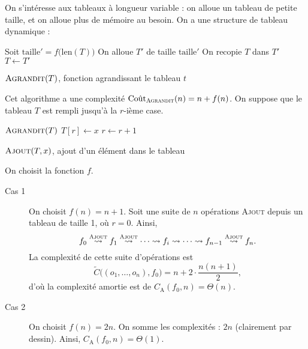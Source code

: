 \documentclass[a4paper]{article}
\begin{document}
	\begin{exm}
		On s'intéresse aux tableaux à longueur variable : on alloue un tableau de petite taille, et on alloue plus de mémoire au besoin.
		On a une structure de tableau dynamique :
		\begin{algorithm}[H]
			\centering
			\begin{algorithmic}[1]
				\State Soit $\mathrm{taille}' = f\big(\mathrm{len}(T)\big)$ 
				\State On alloue $T'$\/ de taille $\mathrm{taille}'$
				\State On recopie $T$\/ dans $T'$\/
				\State $T \gets T'$\/
			\end{algorithmic}
			\caption{$\textsc{Agrandit}(T)$, fonction agrandissant le tableau $t$\/}
		\end{algorithm}
		Cet algorithme a une complexité $\mathrm{Co\hat ut}_\textsc{Agrandit}(n) = n + f(n)$.
		On suppose que le tableau $T$\/ est rempli jusqu'à la $r$-ième case.
		\begin{algorithm}[H]
			\centering
			\begin{algorithmic}[1]
				\State $\textsc{Agrandit}(T)$
				\EndIf
				\State $T[r] \gets x$
				\State $r \gets r + 1$
			\end{algorithmic}
			\caption{$\textsc{Ajout}(T,x)$, ajout d'un élément dans le tableau}
		\end{algorithm}
		On choisit la fonction $f$.
		\begin{description}
			\item[Cas 1] On choisit $f(n) = n + 1$. Soit une suite de $n$\/ opérations \textsc{Ajout} depuis un tableau de taille 1, où $r = 0$. Ainsi, \[
					f_0\overset{\textsc{Ajout}}\leadsto f_1 \overset{\textsc{Ajout}}\leadsto \cdots \leadsto f_i \leadsto \cdots \leadsto f_{n-1} \overset{\textsc{Ajout}}\leadsto f_n
				.\] La complexité de cette suite d'opérations est \[
					\tilde C\big((o_1, \ldots, o_n), f_0) = n + 2 \cdot \frac{n(n+1)}{2},
				\] d'où la complexité amortie est de $C_\mathrm{A}(f_0, n) = \Theta(n)$.
			\item[Cas 2] On choisit $f(n) = 2n$. On somme les complexités : $2n$\/ (clairement par dessin). Ainsi, $C_\mathrm{A}(f_0, n) = \Theta(1)$.
		\end{description}
	\end{exm}
\end{document}
